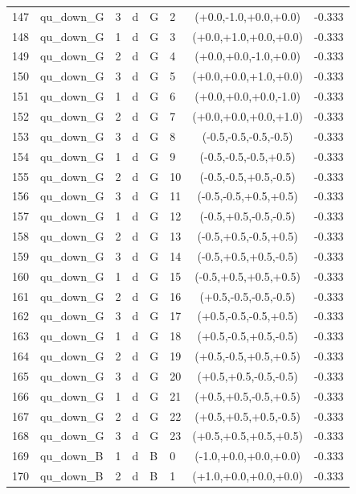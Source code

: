\begin{longtable}{rlllllcl}
147 & qu\_down\_G & 3 & d & G & 2 & (+0.0,-1.0,+0.0,+0.0) & -0.333 \\
148 & qu\_down\_G & 1 & d & G & 3 & (+0.0,+1.0,+0.0,+0.0) & -0.333 \\
149 & qu\_down\_G & 2 & d & G & 4 & (+0.0,+0.0,-1.0,+0.0) & -0.333 \\
150 & qu\_down\_G & 3 & d & G & 5 & (+0.0,+0.0,+1.0,+0.0) & -0.333 \\
151 & qu\_down\_G & 1 & d & G & 6 & (+0.0,+0.0,+0.0,-1.0) & -0.333 \\
152 & qu\_down\_G & 2 & d & G & 7 & (+0.0,+0.0,+0.0,+1.0) & -0.333 \\
153 & qu\_down\_G & 3 & d & G & 8 & (-0.5,-0.5,-0.5,-0.5) & -0.333 \\
154 & qu\_down\_G & 1 & d & G & 9 & (-0.5,-0.5,-0.5,+0.5) & -0.333 \\
155 & qu\_down\_G & 2 & d & G & 10 & (-0.5,-0.5,+0.5,-0.5) & -0.333 \\
156 & qu\_down\_G & 3 & d & G & 11 & (-0.5,-0.5,+0.5,+0.5) & -0.333 \\
157 & qu\_down\_G & 1 & d & G & 12 & (-0.5,+0.5,-0.5,-0.5) & -0.333 \\
158 & qu\_down\_G & 2 & d & G & 13 & (-0.5,+0.5,-0.5,+0.5) & -0.333 \\
159 & qu\_down\_G & 3 & d & G & 14 & (-0.5,+0.5,+0.5,-0.5) & -0.333 \\
160 & qu\_down\_G & 1 & d & G & 15 & (-0.5,+0.5,+0.5,+0.5) & -0.333 \\
161 & qu\_down\_G & 2 & d & G & 16 & (+0.5,-0.5,-0.5,-0.5) & -0.333 \\
162 & qu\_down\_G & 3 & d & G & 17 & (+0.5,-0.5,-0.5,+0.5) & -0.333 \\
163 & qu\_down\_G & 1 & d & G & 18 & (+0.5,-0.5,+0.5,-0.5) & -0.333 \\
164 & qu\_down\_G & 2 & d & G & 19 & (+0.5,-0.5,+0.5,+0.5) & -0.333 \\
165 & qu\_down\_G & 3 & d & G & 20 & (+0.5,+0.5,-0.5,-0.5) & -0.333 \\
166 & qu\_down\_G & 1 & d & G & 21 & (+0.5,+0.5,-0.5,+0.5) & -0.333 \\
167 & qu\_down\_G & 2 & d & G & 22 & (+0.5,+0.5,+0.5,-0.5) & -0.333 \\
168 & qu\_down\_G & 3 & d & G & 23 & (+0.5,+0.5,+0.5,+0.5) & -0.333 \\
169 & qu\_down\_B & 1 & d & B & 0 & (-1.0,+0.0,+0.0,+0.0) & -0.333 \\
170 & qu\_down\_B & 2 & d & B & 1 & (+1.0,+0.0,+0.0,+0.0) & -0.333 \\

\end{longtable}
